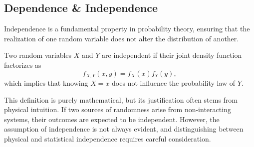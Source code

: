\documentclass[11pt, headings=standardclasses, parskip=half, twoside]{scrartcl}
\newcommand{\dif}{\mathrm{d}}
\newcommand{\Prob}{\operatorname{P}}
\begin{document}



\subsection{Dependence \& Independence}\label{subsec:independence}
Independence is a fundamental property in probability theory, ensuring that the realization of one random variable does not alter the distribution of another. 

\begin{definition}[Independence]\label{def:independence}
Two random variables \(X\) and \(Y\) are independent if their joint density function factorizes as
\[
f_{X,Y}(x,y)=f_X(x)f_Y(y),
\]
which implies that knowing \(X=x\) does not influence the probability law of \(Y\).
\end{definition}
This definition is purely mathematical, but its justification often stems from physical intuition. 
If two sources of randomness arise from non-interacting systems, their outcomes are expected to be independent. 
However, the assumption of independence is not always evident, and distinguishing between physical and statistical independence requires careful consideration.
\end{document}
